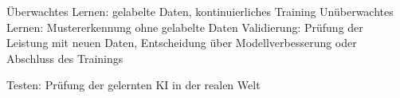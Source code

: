 \documentclass{article}
\begin{document}
\vspace{2mm}Überwachtes Lernen: gelabelte Daten, kontinuierliches Training
Unüberwachtes Lernen: Mustererkennung ohne gelabelte Daten
Validierung: Prüfung der Leistung mit neuen Daten, Entscheidung über Modellverbesserung oder Abschluss des Trainings

\vspace{2mm}Testen: Prüfung der gelernten KI in der realen Welt




\printbibliography
\end{document}
